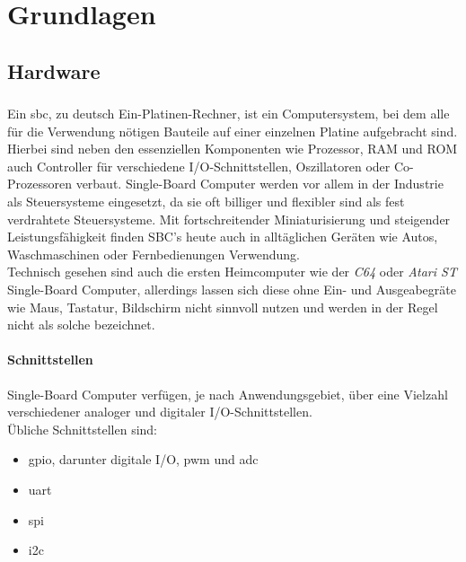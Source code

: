 \chapter{Grundlagen}

\section{Hardware}

\subsection{}
Ein \gls{sbc}, zu deutsch Ein-Platinen-Rechner, ist ein Computersystem, bei dem alle für die Verwendung nötigen Bauteile auf einer einzelnen Platine aufgebracht sind. Hierbei sind neben den essenziellen Komponenten wie Prozessor, RAM und ROM auch Controller für verschiedene I/O-Schnittstellen, Oszillatoren oder Co-Prozessoren verbaut. Single-Board Computer werden vor allem in der Industrie als Steuersysteme eingesetzt, da sie oft billiger und flexibler sind als fest verdrahtete Steuersysteme. Mit fortschreitender Miniaturisierung und steigender Leistungsfähigkeit finden SBC's heute auch in alltäglichen Geräten wie Autos, Waschmaschinen oder Fernbedienungen Verwendung.\\

Technisch gesehen sind auch die ersten Heimcomputer wie der \emph{C64} oder \emph{Atari ST} Single-Board Computer, allerdings lassen sich diese ohne Ein- und Ausgeabegräte wie Maus, Tastatur, Bildschirm nicht sinnvoll nutzen und werden in der Regel nicht als solche bezeichnet.


\subsubsection{Schnittstellen}
Single-Board Computer verfügen, je nach Anwendungsgebiet, über eine Vielzahl verschiedener analoger und digitaler I/O-Schnittstellen.\\

\noindent Übliche Schnittstellen sind:

\begin{itemize}
\item \gls{gpio}, darunter digitale I/O, \gls{pwm} und \gls{adc}
\item \gls{uart}
\item \gls{spi}
\item \gls{i2c}
\end{itemize}

